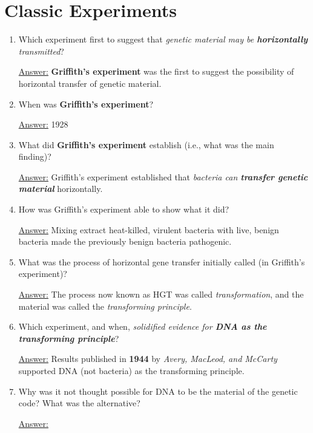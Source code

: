 \documentclass{article}
\newenvironment{QandA}{\begin{enumerate}[label=\bfseries Q\arabic*.]}
                       {\end{enumerate}}
\newenvironment{answered}{\par\normalfont\underline{Answer:}}{}
\begin{document}
\section{Classic Experiments}
\begin{QandA}
  \item{Which experiment first to suggest that \textit{genetic material may be \textbf{horizontally} transmitted}?}
    \begin{answered}
    \textbf{Griffith's experiment} was the first to suggest the possibility of horizontal transfer of genetic material.
    \end{answered}
  \item{When was \textbf{Griffith's experiment}?}
    \begin{answered}
    1928
    \end{answered}
  \item{What did \textbf{Griffith's experiment} establish (i.e., what was the main finding)?}
    \begin{answered}
    Griffith's experiment established that \textit{bacteria can \textbf{transfer genetic material}} horizontally.
    \end{answered}
  \item{How was Griffith's experiment able to show what it did?}
    \begin{answered}
    Mixing extract heat-killed, virulent bacteria with live, benign bacteria made the previously benign bacteria pathogenic.
    \end{answered}
  \item{What was the process of horizontal gene transfer initially called (in Griffith's experiment)?}
    \begin{answered}
    The process now known as HGT was called \textit{transformation}, and the material was called the \textit{transforming principle}.
    \end{answered}
  \item{Which experiment, and when, \textit{solidified evidence for \textbf{DNA as the transforming principle}}?}
    \begin{answered}
    Results published in \textbf{1944} by \textit{Avery, MacLeod, and McCarty} supported DNA (not bacteria) as the transforming principle.
    \end{answered}
  \item{Why was it not thought possible for DNA to be the material of the genetic code? What was the alternative?}
    \begin{answered}

\end{answered}
\end{QandA}
\end{document}
